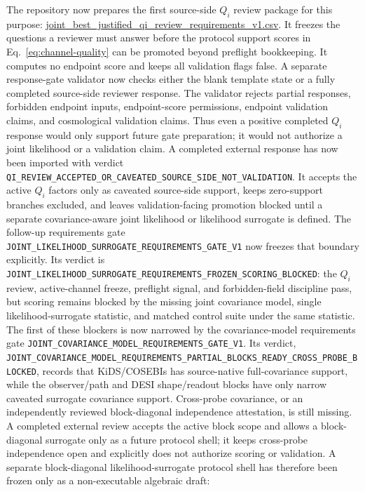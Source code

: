 The repository now prepares the first source-side \(Q_i\) review package for
this purpose:
\url{joint_best_justified_qi_review_requirements_v1.csv}.
It freezes the questions a reviewer must answer before the protocol support
scores in Eq.~\eqref{eq:channel-quality} can be promoted beyond preflight
bookkeeping.  It computes no endpoint score and keeps all validation flags
false.  A separate response-gate validator now checks either the blank template
state or a fully completed source-side reviewer response.  The validator rejects
partial responses, forbidden endpoint inputs, endpoint-score permissions,
endpoint validation claims, and cosmological validation claims.  Thus even a
positive completed \(Q_i\) response would only support future gate preparation;
it would not authorize a joint likelihood or a validation claim.  A completed
external response has now been imported with verdict
\texttt{QI\_REVIEW\_ACCEPTED\_OR\_CAVEATED\_SOURCE\_SIDE\_NOT\_VALIDATION}.
It accepts the active \(Q_i\) factors only as caveated source-side support,
keeps zero-support branches excluded, and leaves validation-facing promotion
blocked until a separate covariance-aware joint likelihood or likelihood
surrogate is defined.  The follow-up requirements gate
\texttt{JOINT\_LIKELIHOOD\_SURROGATE\_REQUIREMENTS\_GATE\_V1} now freezes
that boundary explicitly.  Its verdict is
\texttt{JOINT\_LIKELIHOOD\_SURROGATE\_REQUIREMENTS\_FROZEN\_SCORING\_BLOCKED}:
the \(Q_i\) review, active-channel freeze, preflight signal, and
forbidden-field discipline pass, but scoring remains blocked by the missing
joint covariance model, single likelihood-surrogate statistic, and matched
control suite under the same statistic.  The first of these blockers is now
narrowed by the covariance-model requirements gate
\texttt{JOINT\_COVARIANCE\_MODEL\_REQUIREMENTS\_GATE\_V1}.  Its verdict,
\texttt{JOINT\_COVARIANCE\_MODEL\_REQUIREMENTS\_PARTIAL\_BLOCKS\_READY\_CROSS\_PROBE\_BLOCKED},
records that KiDS/COSEBIs has source-native full-covariance support, while the
observer/path and DESI shape/readout blocks have only narrow caveated surrogate
covariance support.  Cross-probe covariance, or an independently reviewed
block-diagonal independence attestation, is still missing.  A completed
external review accepts the active block scope and allows a block-diagonal
surrogate only as a future protocol shell; it keeps cross-probe independence
open and explicitly does not authorize scoring or validation.  A separate
block-diagonal likelihood-surrogate protocol shell has therefore been frozen
only as a non-executable algebraic draft:
